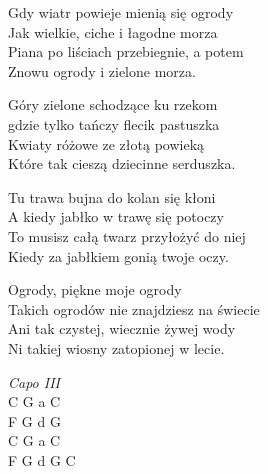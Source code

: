 \begin{text}
    \chordfill
    Gdy wiatr powieje mienią się ogrody\\
    Jak wielkie, ciche i łagodne morza\\
    Piana po liściach przebiegnie, a potem\\
    Znowu ogrody i zielone morza.

    Góry zielone schodzące ku rzekom\\
    gdzie tylko tańczy flecik pastuszka\\
    Kwiaty różowe ze złotą powieką\\
    Które tak cieszą dziecinne serduszka.

    Tu trawa bujna do kolan się kłoni\\
    A kiedy jabłko w trawę się potoczy\\
    To musisz całą twarz przyłożyć do niej\\
    Kiedy za jabłkiem gonią twoje oczy.

    Ogrody, piękne moje ogrody\\
    Takich ogrodów nie znajdziesz na świecie\\
    Ani tak czystej, wiecznie żywej wody\\
    Ni takiej wiosny zatopionej w lecie.
\end{text}
\begin{chord}
    \textit{Capo III}\\
    C G	a C\\
    F G	d G\\
    C G	a C\\
    F G	d G	C
\end{chord}